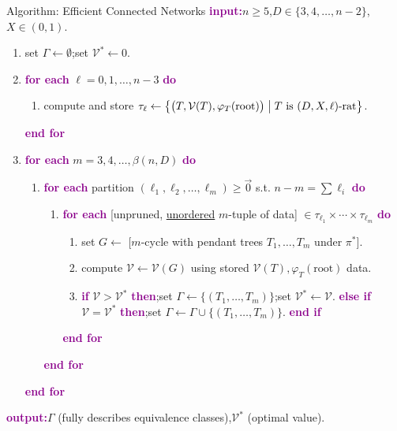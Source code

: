 \documentclass[xcolor=svgnames]{beamer}
\renewcommand{\emph}[1]{\textcolor{DarkMagenta}{\textbf{#1}}}
\def\V{\mathcal{V}}
\begin{document}
\begin{frame}{Algorithm: Efficient Connected Networks}
    \emph{input:}\quad $n \ge 5$,\quad $D \in \{3, 4, \ldots, n - 2\}$,\quad $X \in (0, 1)$.\vfill
    \begin{enumerate}
        \item set $\Gamma \gets \emptyset$;\quad set $\V^* \gets 0$.\vfill
        \item \emph{for each} $\ell = 0, 1, \ldots, n - 3$ \emph{do}\vfill
        \begin{enumerate}
            \item compute and store $\tau_{\ell} \gets \bigl\{\bigl(T, \V(T), \varphi_T(\text{root})\bigr) \bigm| T \text{ is } (D, X, \ell)\text{-rat}\bigr\}$.
        \end{enumerate}
        \emph{end for}\vfill
        \item \emph{for each} $m = 3, 4, \ldots, \beta(n, D)$ \emph{do}\vfill
        \begin{enumerate}
            \item \emph{for each} partition $(\ell_1, \ell_2, \ldots, \ell_m) \ge \vec{0}$ s.t. $n - m = \sum\ell_i$ \emph{do}\vfill
            \begin{enumerate}
                \item \emph{for each} [unpruned, \underline{unordered} $m$-tuple of data] $\in \tau_{\ell_1} \times \cdots \times \tau_{\ell_m}$ \emph{do}
                \begin{enumerate}
                    \item set $G \gets$ [$m$-cycle with pendant trees $T_1, \ldots, T_m$ under $\pi^*$].
                    \item compute $\mathcal{V} \gets \V(G)$ using stored $\V(T), \varphi_T(\text{root})$ data.
                    \item \emph{if} $\V > \V^*$ \emph{then};\quad set $\Gamma \gets \{(T_1, \ldots, T_m)\}$;\quad set $\V^* \gets \V$.\vfill
                    \emph{else if} $\V = \V^*$ \emph{then};\quad set $\Gamma \gets \Gamma \cup \{(T_1, \ldots, T_m)\}$.\vfill
                    \emph{end if}\vfill
                \end{enumerate}
                \emph{end for}\vfill
            \end{enumerate}
            \emph{end for}\vfill
        \end{enumerate}
        \emph{end for}\vfill
    \end{enumerate}
    \emph{output:}\quad $\Gamma$ (fully describes equivalence classes),\quad $\V^*$ (optimal value).
\end{frame}
\end{document}
